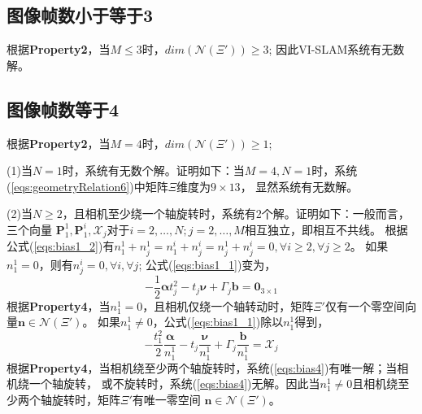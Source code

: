 \documentclass{article}
\begin{document}
\subsection{图像帧数小于等于3}
根据\textbf{Property2}，当$M\leqslant 3$时，$dim(\mathcal{N}(\Xi'))\geqslant 3$;
因此VI-SLAM系统有无数解。

\subsection{图像帧数等于4}
根据\textbf{Property2}，当$M=4$时，$dim(\mathcal{N}(\Xi'))\geqslant 1$; 
\par
(1)当$N=1$时，系统有无数个解。证明如下：当$M=4,N=1$时，系统(\ref{eqs:geometryRelation6})中矩阵$\Xi$维度为$9\times 13$，
显然系统有无数解。
\par
(2)当$N\geqslant 2$，且相机至少绕一个轴旋转时，系统有2个解。证明如下：一般而言，三个向量
$\textbf{P}_1^1,\textbf{P}_1^i,\mathcal{X}_j$对于$i=2,\dots,N; j=2,\dots,M$相互独立，即相互不共线。
根据公式(\ref{eqs:bias1_2})有$n_1^1+n_j^1=n_1^i+n_j^i=n_j^1+n_j^i=0,\forall i\geqslant 2,\forall j\geqslant 2$。
如果$n_1^1=0$，则有$n_j^i=0,\forall i,\forall j$; 公式(\ref{eqs:bias1_1})变为，
\begin{equation}
    -\frac{1}{2}\mathbf{\alpha}t_j^2-t_j\mathbf{\nu}+\Gamma_j\textbf{b}=\textbf{0}_{3\times 1}
\end{equation}
根据\textbf{Property4}，当$n_1^1=0$，且相机仅绕一个轴转动时，矩阵$\Xi'$仅有一个零空间向量$\textbf{n}\in\mathcal{N}(\Xi')$。
如果$n_1^1\not=0$，公式(\ref{eqs:bias1_1})除以$n_1^1$得到，
\begin{equation}\label{eqs:bias4}
    -\frac{t_1^2}{2}\frac{\mathbf{\alpha}}{n_1^1}-t_{j}\frac{\mathbf{\nu}}{n_1^1}+\Gamma_{j}\frac{\textbf{b}}{n_1^1}=\mathcal{X}_j
\end{equation}
根据\textbf{Property4}，当相机绕至少两个轴旋转时，系统(\ref{eqs:bias4})有唯一解；当相机绕一个轴旋转，
或不旋转时，系统(\ref{eqs:bias4})无解。因此当$n_1^1\not=0$且相机绕至少两个轴旋转时，矩阵$\Xi'$有唯一零空间
$\textbf{n}\in\mathcal{N}(\Xi')$。
\end{document}
